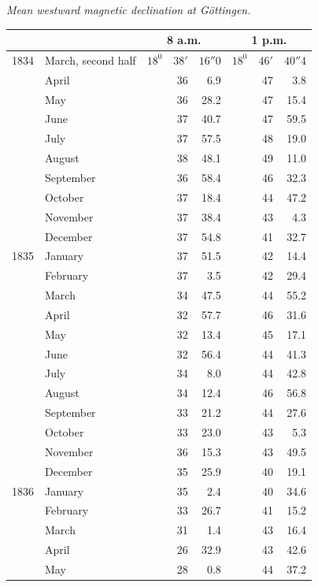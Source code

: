 \begin{center}\textit{Mean westward magnetic declination at Göttingen.}\end{center}
\begin{center}\small
\begin{tabular}{rl|rrr|rrr}
&&\multicolumn{3}{c|}{8 a.m.}&\multicolumn{3}{c}{1 p.m.}\\\hline
1834&March, second half&$18^0$&$38'$&$16''0$&$18^0$&$46'$&$40''4$\\
&April&&36&6.9&&47&3.8\\
&May&&36&28.2&&47&15.4\\
&June&&37&40.7&&47&59.5\\
&July&&37&57.5&&48&19.0\\
&August&&38&48.1&&49&11.0\\
&September&&36&58.4&&46&32.3\\
&October&&37&18.4&&44&47.2\\
&November&&37&38.4&&43&4.3\\
&December&&37&54.8&&41&32.7\\[4pt]
1835&January&&37&51.5&&42&14.4\\
&February&&37&3.5&&42&29.4\\
&March&&34&47.5&&44&55.2\\
&April&&32&57.7&&46&31.6\\
&May&&32&13.4&&45&17.1\\
&June&&32&56.4&&44&41.3\\
&July&&34&8.0&&44&42.8\\
&August&&34&12.4&&46&56.8\\
&September&&33&21.2&&44&27.6\\
&October&&33&23.0&&43&5.3\\
&November&&36&15.3&&43&49.5\\
&December&&35&25.9&&40&19.1\\[4pt]
1836&January&&35&2.4&&40&34.6\\
&February&&33&26.7&&41&15.2\\
&March&&31&1.4&&43&16.4\\
&April&&26&32.9&&43&42.6\\
&May&&28&0.8&&44&37.2
\end{tabular}
\end{center}
